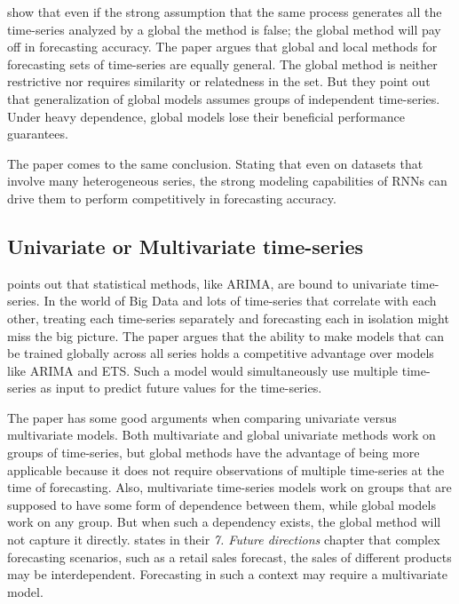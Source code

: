


\cite{Rabanser2020} show that even if the strong assumption that the same process generates all the time-series analyzed by a global
the method is false; the global method will pay off in forecasting accuracy.
The paper argues that global and local methods for forecasting
sets of time-series are equally general. The global method is neither restrictive nor requires
similarity or relatedness in the set.
But they point out that generalization of global models assumes groups of independent time-series.
Under heavy dependence, global models lose their beneficial performance guarantees.

The paper \cite{Hewamalage2021} comes to the same conclusion. Stating that
even on datasets that involve many heterogeneous series, the strong modeling capabilities of RNNs can drive
them to perform competitively in forecasting accuracy.

\subsection{Univariate or Multivariate time-series}
\cite{Bandara2017} points out that statistical methods, like ARIMA, are bound to
univariate time-series. In the world of Big Data and lots of time-series that correlate with each other,
treating each time-series separately and forecasting each in isolation might miss the big picture.
The paper argues that the ability to make models that can be trained globally across all series
holds a competitive advantage over models like ARIMA and ETS.
Such a model would simultaneously use multiple time-series as input to predict future values for the time-series.

The paper \cite{Rabanser2020} has some good arguments when comparing univariate versus multivariate models.
Both multivariate and global univariate methods work on groups of time-series, but global methods
have the advantage of being more applicable because it does not require observations of multiple
time-series at the time of forecasting.
Also, multivariate time-series models work on groups that are supposed to have some form of
dependence between them, while global models work on any group.
But when such a dependency exists, the global method will not capture it directly.
\cite{Hewamalage2021} states in their \textit{7. Future directions} chapter that complex
forecasting scenarios, such as a retail sales forecast, the sales of different products
may be interdependent.
Forecasting in such a context may require a multivariate model.

